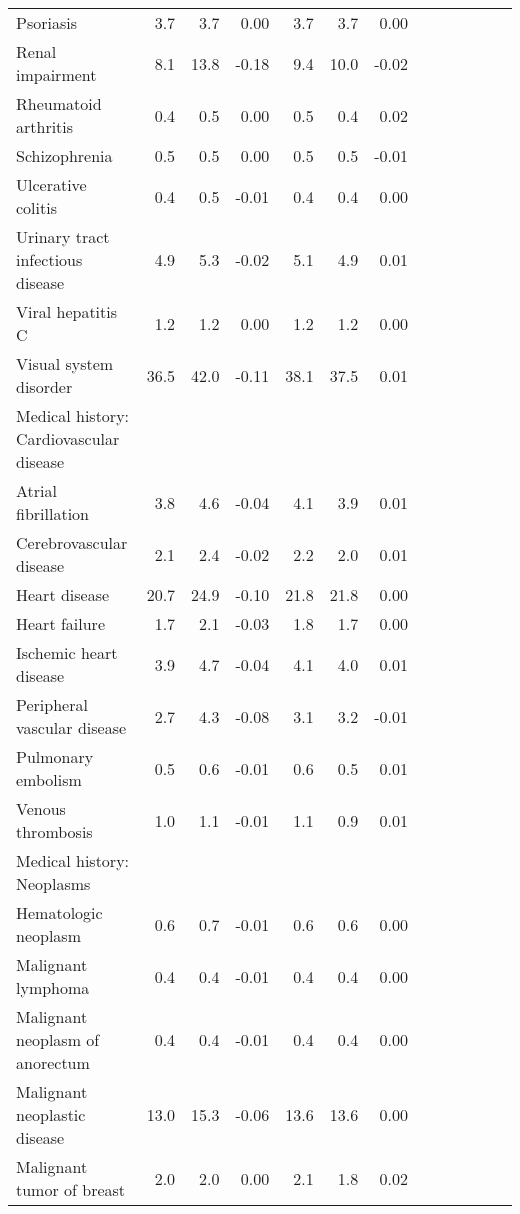 \documentclass[11pt,]{article}
\begin{document}
\begin{longtable}{lrrrrrrrrrrrr}
      Psoriasis &  3.7 &  3.7 &  0.00 &  3.7 &  3.7 &  0.00 \\ 
      Renal impairment &  8.1 & 13.8 & -0.18 &  9.4 & 10.0 & -0.02 \\ 
      Rheumatoid arthritis &  0.4 &  0.5 &  0.00 &  0.5 &  0.4 &  0.02 \\ 
      Schizophrenia &  0.5 &  0.5 &  0.00 &  0.5 &  0.5 & -0.01 \\ 
      Ulcerative colitis &  0.4 &  0.5 & -0.01 &  0.4 &  0.4 &  0.00 \\ 
      Urinary tract infectious disease &  4.9 &  5.3 & -0.02 &  5.1 &  4.9 &  0.01 \\ 
      Viral hepatitis C &  1.2 &  1.2 &  0.00 &  1.2 &  1.2 &  0.00 \\ 
      Visual system disorder & 36.5 & 42.0 & -0.11 & 38.1 & 37.5 &  0.01 \\ 
  Medical history: Cardiovascular disease &    &    &     &    &    &     \\ 
      Atrial fibrillation &  3.8 &  4.6 & -0.04 &  4.1 &  3.9 &  0.01 \\ 
      Cerebrovascular disease &  2.1 &  2.4 & -0.02 &  2.2 &  2.0 &  0.01 \\ 
      Heart disease & 20.7 & 24.9 & -0.10 & 21.8 & 21.8 &  0.00 \\ 
      Heart failure &  1.7 &  2.1 & -0.03 &  1.8 &  1.7 &  0.00 \\ 
      Ischemic heart disease &  3.9 &  4.7 & -0.04 &  4.1 &  4.0 &  0.01 \\ 
      Peripheral vascular disease &  2.7 &  4.3 & -0.08 &  3.1 &  3.2 & -0.01 \\ 
      Pulmonary embolism &  0.5 &  0.6 & -0.01 &  0.6 &  0.5 &  0.01 \\ 
      Venous thrombosis &  1.0 &  1.1 & -0.01 &  1.1 &  0.9 &  0.01 \\ 
  Medical history: Neoplasms &    &    &     &    &    &     \\ 
      Hematologic neoplasm &  0.6 &  0.7 & -0.01 &  0.6 &  0.6 &  0.00 \\ 
      Malignant lymphoma &  0.4 &  0.4 & -0.01 &  0.4 &  0.4 &  0.00 \\ 
      Malignant neoplasm of anorectum &  0.4 &  0.4 & -0.01 &  0.4 &  0.4 &  0.00 \\ 
      Malignant neoplastic disease & 13.0 & 15.3 & -0.06 & 13.6 & 13.6 &  0.00 \\ 
      Malignant tumor of breast &  2.0 &  2.0 &  0.00 &  2.1 &  1.8 &  0.02 \\ 

\end{longtable}
\end{document}
